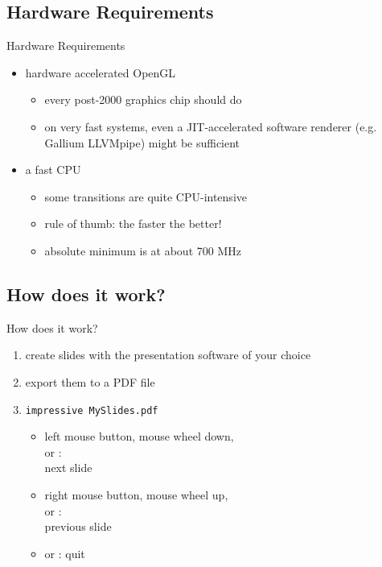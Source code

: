 \documentclass[bigger,hyperref={colorlinks=true,linkcolor=white,urlcolor=blue}]{beamer}
\begin{document}
\subsection{Hardware Requirements}
\begin{frame}{Hardware Requirements}
    \begin{itemize}
        \item hardware accelerated OpenGL
            \begin{itemize}
                \item every post-2000 graphics chip should do
                \item on very fast systems, even a JIT-accelerated software
                      renderer (e.g. Gallium LLVMpipe) might be sufficient
            \end{itemize}
        \item a fast CPU
            \begin{itemize}
                \item some transitions are quite CPU-intensive
                \item rule of thumb: the faster the better!
                \item absolute minimum is at about 700 MHz
            \end{itemize}
    \end{itemize}
\end{frame}

\subsection{How does it work?}
\begin{frame}{How does it work?}
    \begin{enumerate}
        \item create slides with the presentation software of your choice
        \item export them to a PDF file
        \item \texttt{impressive MySlides.pdf}
            \begin{itemize}
                \item left mouse button, mouse wheel down, \\
                      \PgDown or : \\
                      \hspace{1cm} next slide
                \item right mouse button, mouse wheel up, \\
                      \PgUp or : \\
                      \hspace{1cm} previous slide
                \item {} or \Esc: quit
            \end{itemize}
    \end{enumerate}
\end{frame}
\end{document}
